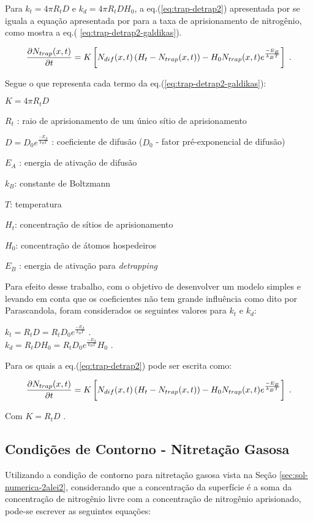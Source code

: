 Para $k_t = 4{\pi}R_tD$ e $k_d = 4{\pi}R_tDH_0$, a eq.(\ref{eq:trap-detrap2}) apresentada por \cite{parascandola2000nitrogen} se iguala a equação apresentada por \cite{moskalioviene2011modeling} para a taxa de aprisionamento de nitrogênio, como mostra a eq.( \ref{eq:trap-detrap2-galdikas}).

\begin{equation}
\label{eq:trap-detrap2-galdikas}
\pdv{N_{trap}(x,t)}{t} = K\left[N_{dif}(x,t)\left(H_t-N_{trap}(x,t)\right) - H_0 N_{trap}(x,t)e^{\frac{-E_B}{k_BT}}\right]  \;.
\end{equation}

Segue o que representa cada termo da eq.(\ref{eq:trap-detrap2-galdikas}):

$K=4{\pi}R_tD$

$R_t$ : raio de aprisionamento de um único sítio de aprisionamento

$D=D_0e^{\frac{-E_A}{k_BT}}$ : coeficiente de difusão ($D_0$ - fator pré-exponencial de difusão)

$E_A$ : energia de ativação de difusão

$k_B$: constante de Boltzmann 
	
$T$: temperatura

$H_t$: concentração de sítios de aprisionamento

$H_0$: concentração de átomos hospedeiros
	
$E_B$ : energia de ativação para \textit{detrapping}

Para efeito desse trabalho, com o objetivo de desenvolver um modelo simples e levando em conta que os coeficientes não tem grande influência como dito por Parascandola, foram considerados os seguintes valores para $k_t$ e $k_d$:
\begin{center}
$k_t = R_tD = R_tD_0e^{\frac{-E_A}{k_BT}}$ \;. \\ $k_d = R_tDH_0 = R_tD_0e^{\frac{-E_A}{k_BT}}H_0$ \;.
\end{center}

Para os quais a eq.(\ref{eq:trap-detrap2}) pode ser escrita como:

\begin{equation}
\label{eq:trap-detrap2-me}
\pdv{N_{trap}(x,t)}{t} = K\left[N_{dif}(x,t)\left(H_t-N_{trap}(x,t)\right) - H_0 N_{trap}(x,t)e^{\frac{-E_B}{k_BT}}\right] \;.
\end{equation}

Com $K=R_tD$ .

\subsection{Condições de Contorno - Nitretação Gasosa}
\label{sec:trap-detrap-gas-cc}
Utilizando a condição de contorno para nitretação gasosa vista na Seção \ref{sec:sol-numerica-2alei2}, considerando que a concentração da superfície é a soma da concentração de nitrogênio livre com a concentração de nitrogênio aprisionado, pode-se escrever as seguintes equações:

